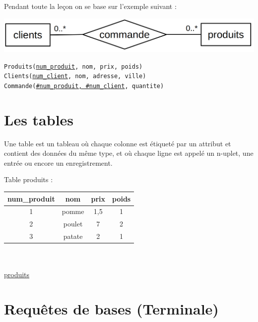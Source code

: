 
Pendant toute la leçon on se base sur l'exemple suivant :

\begin{center}
	\includegraphics[width=0.6\linewidth]{lecon/28-sql/schema-EA.png}
\end{center}

\noindent \texttt{Produits(\underline{num\_produit}, nom, prix, poids)}\\
\texttt{Clients(\underline{num\_client}, nom, adresse, ville)}\\
\texttt{Commande(\underline{\#num\_produit, \#num\_client}, quantite)}

\section{Les tables}

\begin{definition}
	Une table est un tableau où chaque colonne est étiqueté par un attribut et contient des données du même type, et où chaque ligne est appelé un n-uplet, une entrée ou encore un enregistrement.	
\end{definition}

\begin{example}
	Table produits :
	\begin{center}
		\begin{tabular}{|c|c|c|c|}
			\hline num\_produit & nom & prix & poids \\ \hline
			1 & pomme & 1,5 & 1 \\ \hline
			2 & poulet & 7 & 2 \\ \hline
			3 & patate & 2 & 1 \\ \hline
		\end{tabular}
		\\
		\enspace \\
		\underline{produits}
	\end{center}
\end{example}

\section{Requêtes de bases (Terminale)}

